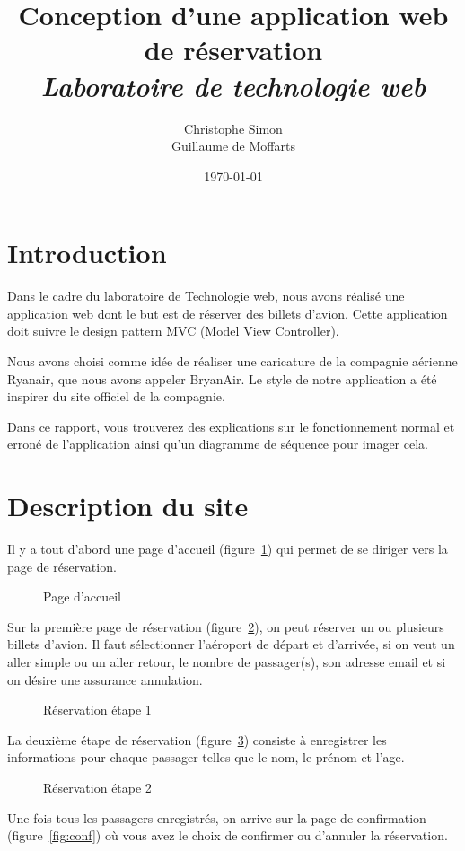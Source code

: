 \documentclass[12pt,a4paper]{article}
\title{Conception d'une application web de réservation\\[3mm] \normalsize{\it Laboratoire de technologie web}}
\author{Christophe Simon \\ Guillaume de Moffarts}
\date{\today}
\begin{document}
	\maketitle
	\section*{Introduction}
		Dans le cadre du laboratoire de Technologie web, nous avons réalisé une application web dont le but est de réserver des billets d'avion. Cette application doit suivre le design pattern MVC (Model View Controller).

		Nous avons choisi comme idée de réaliser une caricature de la compagnie aérienne Ryanair, que nous avons appeler BryanAir. Le style de notre application a été inspirer du site officiel de la compagnie.

		Dans ce rapport, vous trouverez des explications sur le fonctionnement normal et erroné de l'application ainsi qu'un diagramme de séquence pour imager cela.


	\section{Description du site}
		Il y a tout d'abord une page d'accueil (figure~\ref{fig:home}) qui permet de se diriger vers la page de réservation.
		\begin{figure}
			\caption{Page d'accueil}
			\label{fig:home}
		\end{figure}

		Sur la première page de réservation (figure~\ref{fig:res1}), on peut réserver un ou plusieurs billets d'avion. Il faut sélectionner l'aéroport de départ et d'arrivée, si on veut un aller simple ou un aller retour, le nombre de passager(s), son adresse email et si on désire une assurance annulation.
		\begin{figure}
			\caption{Réservation étape 1}
			\label{fig:res1}
		\end{figure}

		La deuxième étape de réservation (figure~\ref{fig:res2}) consiste à enregistrer les informations pour chaque passager telles que le nom, le prénom et l'age.
		\begin{figure}
			\caption{Réservation étape 2}
			\label{fig:res2}
		\end{figure}

		Une fois tous les passagers enregistrés, on arrive sur la page de confirmation (figure~\ref{fig:conf}) où vous avez le choix de confirmer ou d'annuler la réservation.
\end{document}
